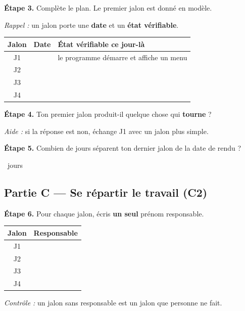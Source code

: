 \textbf{Étape 3.} Complète le plan. Le premier jalon est donné en modèle.

\medskip
\textit{Rappel :} un jalon porte une \textbf{date} et un \textbf{état
vérifiable}.

\bigskip

\begin{center}
\begin{tabular}{|c|c|l|}
\hline
\textbf{Jalon} & \textbf{Date} & \textbf{État vérifiable ce jour-là} \\
\hline
J1 & \dotfill & le programme démarre et affiche un menu \\
\hline
J2 & \dotfill & \dotfill \\
\hline
J3 & \dotfill & \dotfill \\
\hline
J4 & \dotfill & \dotfill \\
\hline
\end{tabular}
\end{center}

\bigskip

\textbf{Étape 4.} Ton premier jalon produit-il quelque chose qui \textbf{tourne} ?

\medskip
\begin{center}
 \qquad {}
\end{center}

\medskip
\textit{Aide :} si la réponse est non, échange J1 avec un jalon plus simple.

\bigskip

\textbf{Étape 5.} Combien de jours séparent ton dernier jalon de la date de rendu ?

\medskip
\dotfill\ jours

\medskip
\begin{center}
 \qquad {}
\end{center}

\bigskip
\bigskip

\subsection*{Partie C --- Se répartir le travail (C2)}

\textbf{Étape 6.} Pour chaque jalon, écris \textbf{un seul} prénom responsable.

\bigskip

\begin{center}
\begin{tabular}{|c|c|}
\hline
\textbf{Jalon} & \textbf{Responsable} \\
\hline
J1 & \dotfill \\
\hline
J2 & \dotfill \\
\hline
J3 & \dotfill \\
\hline
J4 & \dotfill \\
\hline
\end{tabular}
\end{center}

\medskip
\textit{Contrôle :} un jalon sans responsable est un jalon que personne ne fait.
